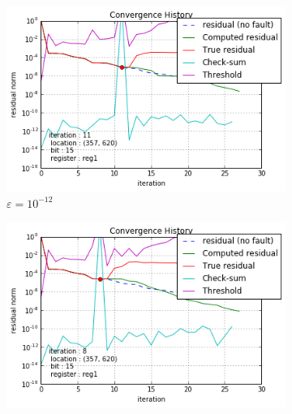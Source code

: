 \documentclass[twoside]{article}
\newcounter{fig}\setcounter{fig}{0}
\begin{document}
  \begin{figure}[H]
    \centering

    \begin{minipage}[b]{0.48\linewidth}
      
      \begin{subfigure}[t]{\linewidth}
        \centering

        \includegraphics[width=1.15\linewidth]{figures/pores_2/convergence_history_problem_0.png}        %
        \caption{$\varepsilon = 10^{-12}$}\label{fig:gre_216a_test_result_1}	
      \end{subfigure}
    \end{minipage}
    \quad
    \begin{minipage}[b]{0.48\linewidth}
      
      
      \begin{subfigure}[t]{\linewidth}
        \centering
\includegraphics[width=1.15\linewidth]{figures/pores_2/convergence_history_problem_1.png}                %
        

\end{subfigure}
\end{minipage}
\end{figure}
\end{document}
